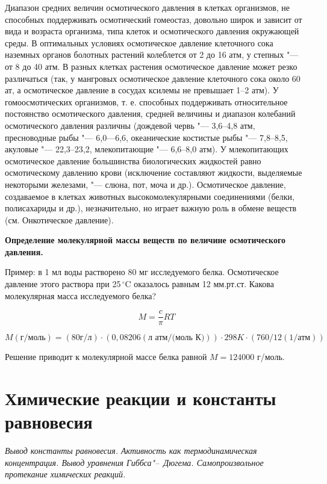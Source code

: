 \documentclass[12pt,a4paper,oneside]{book}
\newcommand{\celcius}{\,^{\circ}\mathrm{C}} %
\begin{document}
Диапазон средних величин осмотического давления в клетках организмов, не способных поддерживать осмотический гомеостаз, довольно широк и зависит от вида и возраста организма, типа клеток и осмотического давления окружающей среды. В оптимальных условиях осмотическое давление клеточного сока наземных органов болотных растений колеблется от 2 до 16 атм, у степных "--- от 8 до 40 атм. В разных клетках растения осмотическое давление может резко различаться (так, у мангровых осмотическое давление клеточного сока около 60 ат, а осмотическое давление в сосудах ксилемы не превышает 1--2 атм). У гомоосмотических организмов, т. е. способных поддерживать относительное постоянство осмотического давления, средней величины и диапазон колебаний осмотического давления различны (дождевой червь "--- 3,6--4,8 атм, пресноводные рыбы "--- 6,0---6,6, океанические костистые рыбы "--- 7,8--8,5, акуловые "--- 22,3--23,2, млекопитающие "--- 6,6--8,0 атм). У млекопитающих осмотическое давление большинства биологических жидкостей равно осмотическому давлению крови (исключение составляют жидкости, выделяемые некоторыми железами, "--- слюна, пот, моча и др.). Осмотическое давление, создаваемое в клетках животных высокомолекулярными соединениями (белки, полисахариды и др.), незначительно, но играет важную роль в обмене веществ (см. Онкотическое давление).

\textbf{Определение молекулярной массы веществ по величине осмотического давления.}

Пример: в 1 мл воды растворено 80 мг исследуемого белка. Осмотическое давление этого раствора при 25$\celcius$ оказалось равным 12 мм.рт.ст. Какова молекулярная масса исследуемого белка? 

\begin{equation}
	M = \frac {c} {\pi} RT
\end{equation}

\begin{equation}
	M (\text {г/моль}) = (80 \text{г/л})\cdot(0,08206 (\text {л атм/(моль К)})) \cdot 298K \cdot (760/12 (\text {1/атм}))
\end{equation}

Решение приводит к молекулярной массе белка равной $M = 124000$ г/моль.




\newpage
\section{Химические реакции и константы равновесия}
{\it Вывод константы равновесия. Активность как термодинамическая концентрация. Вывод уравнения Гиббса"--~Дюгема. Самопроизвольное протекание химических реакций. }
\end{document}
